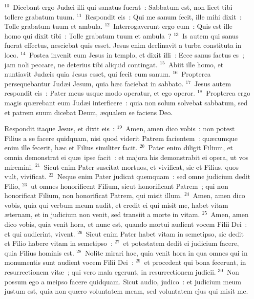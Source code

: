 ${}^{10}$~Dicebant ergo Jud\ae i illi qui sanatus fuerat~: Sabbatum est, non licet tibi tollere grabatum tuum.
${}^{11}$~Respondit eis~: Qui me sanum fecit, ille mihi dixit~: Tolle grabatum tuum et ambula.
${}^{12}$~Interrogaverunt ergo eum~: Quis est ille homo qui dixit tibi~: Tolle grabatum tuum et ambula~?
${}^{13}$~Is autem qui sanus fuerat effectus, nesciebat quis esset. Jesus enim declinavit a turba constituta in loco.
${}^{14}$~Postea invenit eum Jesus in templo, et dixit illi~: Ecce sanus factus es~; jam noli peccare, ne deterius tibi aliquid contingat.
${}^{15}$~Abiit ille homo, et nuntiavit Jud\ae is quia Jesus esset, qui fecit eum sanum.
${}^{16}$~Propterea persequebantur Jud\ae i Jesum, quia h\ae c faciebat in sabbato.
${}^{17}$~Jesus autem respondit eis~: Pater meus usque modo operatur, et ego operor.
${}^{18}$~Propterea ergo magis qu\ae rebant eum Jud\ae i interficere~: quia non solum solvebat sabbatum, sed et patrem suum dicebat Deum, \ae qualem se faciens Deo.

 Respondit itaque Jesus, et dixit eis~:
${}^{19}$~Amen, amen dico vobis~: non potest Filius a se facere quidquam, nisi quod viderit Patrem facientem~: qu\ae cumque enim ille fecerit, h\ae c et Filius similiter facit.
${}^{20}$~Pater enim diligit Filium, et omnia demonstrat ei qu\ae\ ipse facit~: et majora his demonstrabit ei opera, ut vos miremini.
${}^{21}$~Sicut enim Pater suscitat mortuos, et vivificat, sic et Filius, quos vult, vivificat.
${}^{22}$~Neque enim Pater judicat quemquam~: sed omne judicium dedit Filio,
${}^{23}$~ut omnes honorificent Filium, sicut honorificant Patrem~; qui non honorificat Filium, non honorificat Patrem, qui misit illum.
${}^{24}$~Amen, amen dico vobis, quia qui verbum meum audit, et credit ei qui misit me, habet vitam \ae ternam, et in judicium non venit, sed transiit a morte in vitam.
${}^{25}$~Amen, amen dico vobis, quia venit hora, et nunc est, quando mortui audient vocem Filii Dei~: et qui audierint, vivent.
${}^{26}$~Sicut enim Pater habet vitam in semetipso, sic dedit et Filio habere vitam in semetipso~:
${}^{27}$~et potestatem dedit ei judicium facere, quia Filius hominis est.
${}^{28}$~Nolite mirari hoc, quia venit hora in qua omnes qui in monumentis sunt audient vocem Filii Dei~:
${}^{29}$~et procedent qui bona fecerunt, in resurrectionem vit\ae~; qui vero mala egerunt, in resurrectionem judicii.
${}^{30}$~Non possum ego a meipso facere quidquam. Sicut audio, judico~: et judicium meum justum est, quia non qu\ae ro voluntatem meam, sed voluntatem ejus qui misit me.


